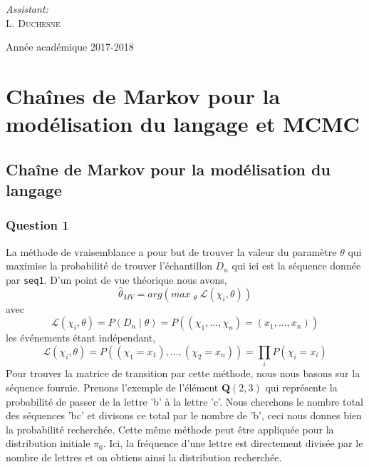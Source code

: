 \documentclass[12pt]{article}
\begin{document}
\begin{titlepage}
\begin{sffamily}
\begin{center}
\begin{minipage}{0.4\textwidth}
\begin{flushright}
        \emph{Assistant:}\\
        L. \textsc{Duchesne}\\
        
      \end{flushright}
    \end{minipage}

    \vfill
    
    {\large Année académique 2017-2018}

  \end{center}
  \end{sffamily}
\end{titlepage}


\section{Chaînes de Markov pour la modélisation du langage et MCMC}
\subsection{Chaîne de Markov pour la modélisation du langage}

\subsubsection*{Question 1}
La méthode de vraisemblance a pour but de trouver la valeur du paramètre $\theta$ qui maximise la probabilité de trouver l'échantillon $ D_n$ qui ici est la séquence donnée par \texttt{seq1}. D'un point de vue théorique nous avons, $$  \hat{\theta}_{MV} = arg(max_{\substack{\theta}} \mathcal{L}(\chi_i ,\theta))$$ avec $$ \mathcal{L}(\chi_i,\theta) = P(D_n \mid \theta) = P((\chi_1, ..., \chi_n) = (x_1, ..., x_n)) $$
les événements étant indépendant,
$$ \mathcal{L}(\chi_i,\theta) = P((\chi_1 = x_1), ..., (\chi_2 = x_n)) = \prod_i P(\chi_i = x_i) $$
Pour trouver la matrice de transition par cette méthode, nous nous basons sur la séquence fournie. Prenons l'exemple de l'élément $\textbf{Q}(2,3)$ qui représente la probabilité de passer de la lettre 'b' à la lettre 'c'. Nous cherchons le nombre total des séquences 'bc' et divisons ce total par le nombre de 'b', ceci nous donnes bien la probabilité recherchée. Cette même méthode peut être appliquée pour la distribution initiale $\pi_0$. Ici, la fréquence d'une lettre est directement divisée par le nombre de lettres et on obtiens ainsi la distribution recherchée.
\end{document}
